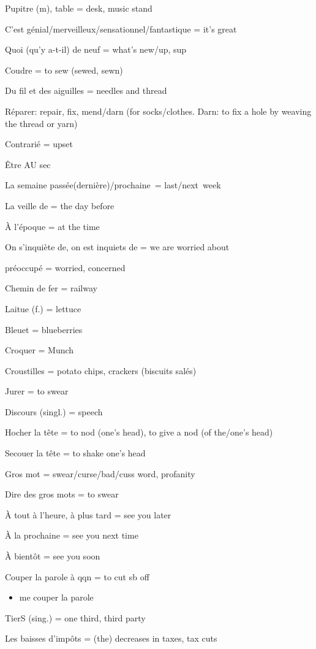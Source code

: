 Pupitre (m), table = desk, music stand

C'est génial/merveilleux/sensationnel/fantastique = it's great~

Quoi (qu'y a-t-il) de neuf = what's new/up, sup

Coudre = to sew (sewed, sewn)

Du fil et des aiguilles = needles and thread

Réparer: repair, fix, mend/darn (for socks/clothes. Darn: to fix a hole
by weaving the thread or yarn)

Contrarié = upset

Être AU sec~

La semaine passée(dernière)/prochaine~= last/next~week~

La veille de = the day before~

À l'époque = at the time~

On s'inquiète de, on est inquiets de = we are worried about~

préoccupé = worried, concerned

Chemin de fer = railway~

Laitue (f.) = lettuce~

Bleuet = blueberries~

Croquer = Munch~

Croustilles = potato chips, crackers (biscuits salés)

Jurer = to swear~

Discours (singl.) = speech~

Hocher la tête = to nod (one's head), to give a nod (of the/one's head)

Secouer la tête = to shake one's head~

Gros mot = swear/curse/bad/cuss word, profanity~

Dire des gros mots = to swear~

À tout à l'heure, à plus tard = see you later~

À la prochaine = see you next time~

À bientôt = see you soon~

Couper la parole à qqn = to cut sb off

\begin{itemize}
\item
  me couper la parole
\end{itemize}

TierS (sing.) = one third, third party~

Les baisses d'impôts = (the) decreases in taxes, tax cuts

